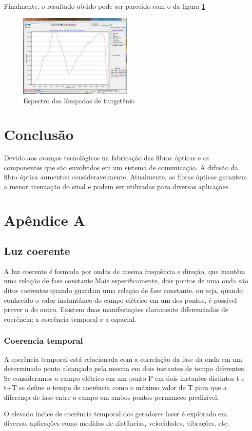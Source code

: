 \documentclass[article]{IEEEtran}
\begin{document}
Finalmente, o resultado obtido pode ser parecido com o da figura \ref{fig:resultado_espectrometro}

\begin{figure}[H]
	\includegraphics[width=0.5\textwidth]{images/resultado_espectrometro.jpg}
	\caption{Espectro das lâmpadas de tungstênio}
	\label{fig:resultado_espectrometro}
\end{figure} 

\section{Conclusão}
Devido aos avanços tecnológicos na fabricação das fibras ópticas e os componentes que são envolvidos em um sistema de comunicação. A difusão da fibra óptica aumentou consideravelmente. Atualmente, as fibras ópticas garantem a menor atenuação do sinal e podem ser utilizadas para diversas aplicações.
\clearpage
\appendix
\section{Apêndice A}
\subsection{Luz coerente}
\label{ap:l-coerente}
A luz coerente é formada por ondas de mesma frequência e direção, que mantêm uma relação de fase constante.Mais especificamente, dois pontos de uma onda são ditos coerentes quando guardam uma relação de fase constante, ou seja, quando conhecido o valor instantâneo do campo elétrico em um dos pontos, é possível prever o do outro. Existem duas manifestações claramente diferenciadas de coerência: a coerência temporal e a espacial.

\subsubsection{Coerencia temporal}
A coerência temporal está relacionada com a correlação da fase da onda em um determinado ponto alcançado pela mesma em dois instantes de tempo diferentes. Se consideramos o campo elétrico em um ponto P em dois instantes distintos t e t+T se define o tempo de coerência como o máximo valor de T para que a diferença de fase entre o campo em ambos pontos permanece predizível.
\par O elevado índice de coerência temporal dos geradores laser é explorado em diversas aplicações como medidas de distâncias, velocidades, vibrações, etc.
\end{document}
